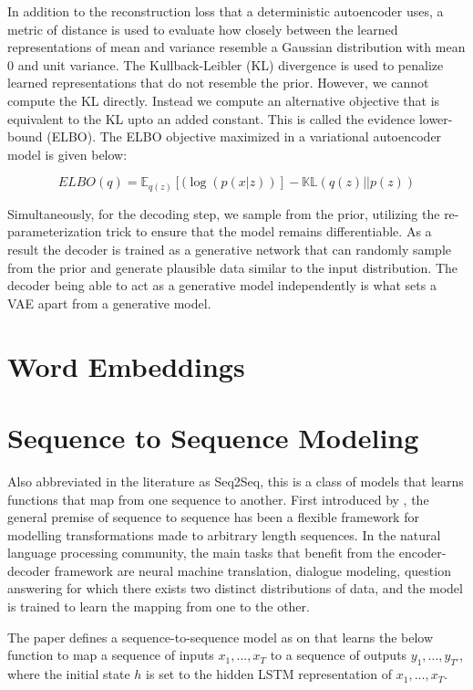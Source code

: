 In addition to the reconstruction loss that a deterministic autoencoder uses, a metric of distance is used to evaluate how closely between the learned representations of mean and variance resemble a Gaussian distribution with mean 0 and unit variance. The Kullback-Leibler (KL) divergence \citep{kullback1951information} is used to penalize learned representations that do not resemble the prior. However, we cannot compute the KL directly. Instead we compute an alternative objective that is equivalent to the KL upto an added constant. This is called the evidence lower-bound (ELBO). The ELBO objective maximized in a variational autoencoder model is given below:

\begin{equation}
	ELBO(q) = \mathbb{E}_{q(z)} [(\log(p(x|z))] - \mathbb{KL}(q(z)||p(z))
\end{equation}

Simultaneously, for the decoding step, we sample from the prior, utilizing the re-parameterization trick to ensure that the model remains differentiable. As a result the decoder is trained as a generative network that can randomly sample from the prior and generate plausible data similar to the input distribution. The decoder being able to act as a generative model independently is what sets a VAE apart from a generative model.


\section{Word Embeddings}


\section{Sequence to Sequence Modeling}

Also abbreviated in the literature as Seq2Seq, this is a class of models that learns functions that map from one sequence to another. First introduced by \cite{sutskever2014sequence}, the general premise of sequence to sequence has been a flexible framework for modelling transformations made to arbitrary length sequences. In the natural language processing community, the main tasks that benefit from the encoder-decoder framework are neural machine translation, dialogue modeling, question answering for which there exists two distinct distributions of data, and the model is trained to learn the mapping from one to the other.

The paper defines a sequence-to-sequence model as on that learns the below function to map a sequence of inputs $x_1, ... , x_T$ to a sequence of outputs $y_1, ... , y_{T′}$, where the initial state $h$ is set to the hidden LSTM representation of $x_1, ... , x_T$.

